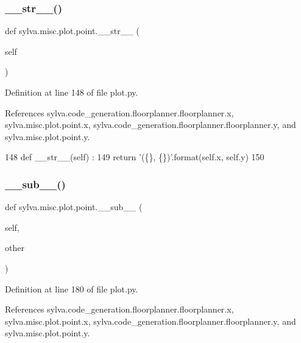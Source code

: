 \subsubsection{\texorpdfstring{\+\_\+\+\_\+str\+\_\+\+\_\+()}{\_\_str\_\_()}}
{\footnotesize\ttfamily def sylva.\+misc.\+plot.\+point.\+\_\+\+\_\+str\+\_\+\+\_\+ (\begin{DoxyParamCaption}\item[{}]{self }\end{DoxyParamCaption})}



Definition at line 148 of file plot.\+py.



References sylva.\+code\+\_\+generation.\+floorplanner.\+floorplanner.\+x, sylva.\+misc.\+plot.\+point.\+x, sylva.\+code\+\_\+generation.\+floorplanner.\+floorplanner.\+y, and sylva.\+misc.\+plot.\+point.\+y.


\begin{DoxyCode}
148     \textcolor{keyword}{def }\_\_str\_\_(self) :
149       \textcolor{keywordflow}{return} \textcolor{stringliteral}{'(\{\}, \{\})'}.format(self.x, self.y)
150 
\end{DoxyCode}
\mbox{\label{classsylva_1_1misc_1_1plot_1_1point_a1670d6546eb506a535047d71dc8faaee}} 
\subsubsection{\texorpdfstring{\+\_\+\+\_\+sub\+\_\+\+\_\+()}{\_\_sub\_\_()}}
{\footnotesize\ttfamily def sylva.\+misc.\+plot.\+point.\+\_\+\+\_\+sub\+\_\+\+\_\+ (\begin{DoxyParamCaption}\item[{}]{self,  }\item[{}]{other }\end{DoxyParamCaption})}



Definition at line 180 of file plot.\+py.



References sylva.\+code\+\_\+generation.\+floorplanner.\+floorplanner.\+x, sylva.\+misc.\+plot.\+point.\+x, sylva.\+code\+\_\+generation.\+floorplanner.\+floorplanner.\+y, and sylva.\+misc.\+plot.\+point.\+y.



